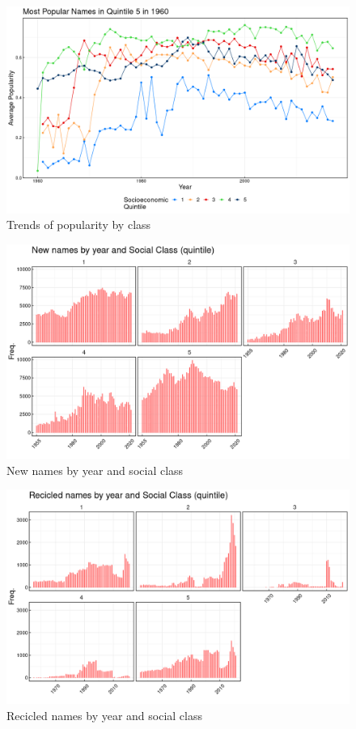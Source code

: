 \begin{figure}[H]
\begin{center}
    \includegraphics[width=15cm]{plot/p4.png}
    \caption{Trends of popularity by class}
    \label{fig:new_names}
\end{center}
\end{figure}


\begin{figure}[H]
\begin{center}
    \includegraphics[width=15cm]{plot/p1.png}
    \caption{New names by year and social class}
    \label{fig:new_names}
\end{center}
\end{figure}


\begin{figure}[H]
\begin{center}
    \includegraphics[width=15cm]{plot/p2.png}
    \caption{Recicled names by year and social class}
    \label{fig:new_names}
\end{center}
\end{figure}




